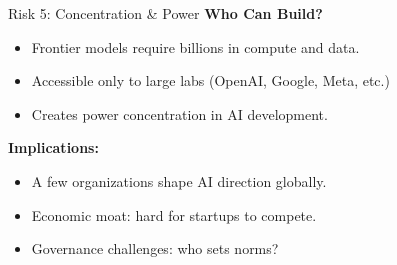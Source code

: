 \documentclass[aspectratio=169,10pt]{beamer}
\begin{document}
\begin{frame}{Risk 5: Concentration \& Power}
  \textbf{Who Can Build?}
  \begin{itemize}
    \item Frontier models require billions in compute and data.
    \item Accessible only to large labs (OpenAI, Google, Meta, etc.)
    \item Creates power concentration in AI development.
  \end{itemize}

  \vspace{0.3cm}

  \textbf{Implications:}
  \begin{itemize}
    \item A few organizations shape AI direction globally.
    \item Economic moat: hard for startups to compete.
    \item Governance challenges: who sets norms?
  \end{itemize}
\end{frame}

\end{document}
